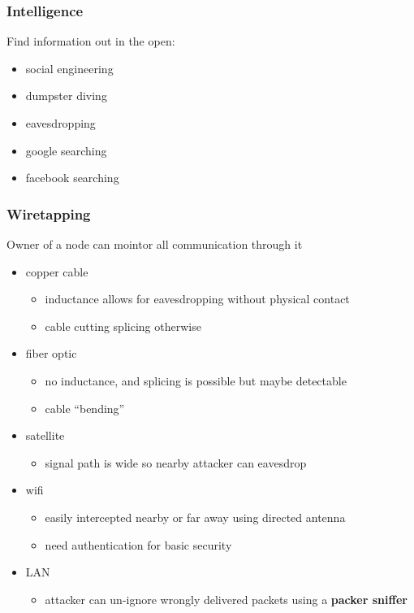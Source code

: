 \documentclass[]{article}
\theoremstyle{definition}
\begin{document}
	\subsubsection{Intelligence}
	Find information out in the open:
	\begin{itemize}
		\item social engineering
		\item dumpster diving
		\item eavesdropping 
		\item google searching
		\item facebook searching
	\end{itemize}

	\subsubsection{Wiretapping}
	Owner of a node can mointor all communication through it
	\begin{itemize}
		\item copper cable
			\begin{itemize}
				\item inductance allows for eavesdropping without physical contact
				\item cable cutting splicing otherwise
			\end{itemize}
		\item fiber optic
			\begin{itemize}
				\item no inductance, and splicing is possible but maybe detectable
				\item cable ``bending''
			\end{itemize}
		\item satellite
			\begin{itemize}
				\item signal path is wide so nearby attacker can eavesdrop
			\end{itemize}
		\item wifi
			\begin{itemize}
				\item easily intercepted nearby or far away using directed antenna
				\item need authentication for basic security
			\end{itemize}
		\item LAN
			\begin{itemize}
				\item attacker can un-ignore wrongly delivered packets using a \textbf{packer sniffer}
			\end{itemize}
	\end{itemize}
\end{document}
